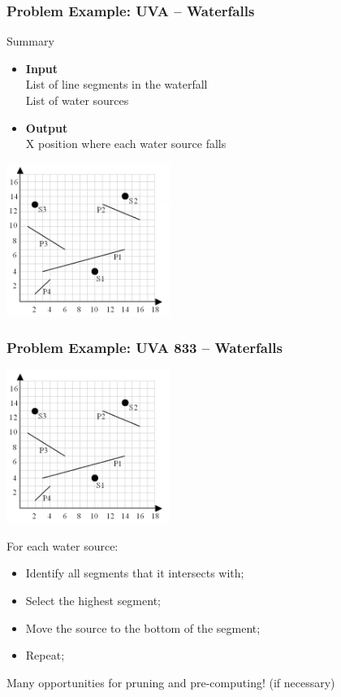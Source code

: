 \begin{frame}
  \frametitle{Problem Example: UVA -- Waterfalls}
  {\small
    \begin{block}{Summary}
      \begin{itemize}
      \item {\bf Input}\\
        List of line segments in the waterfall\\
        List of water sources
      \item {\bf Output}\\
        X position where each water source falls\\
      \end{itemize}
    \end{block}

    \includegraphics[width=0.4\textwidth]{img/waterfall}
  }
\end{frame}
\begin{frame}
  \frametitle{Problem Example: UVA 833 -- Waterfalls}

  \includegraphics[width=0.4\textwidth]{img/waterfall}

  {\smaller
  For each water source:
  \begin{itemize}
  \item Identify all segments that it intersects with;
  \item Select the highest segment;
  \item Move the source to the bottom of the segment;
  \item Repeat;
  \end{itemize}

  \begin{block}{}
    Many opportunities for pruning and pre-computing! (if necessary)
  \end{block}
  }
\end{frame}

